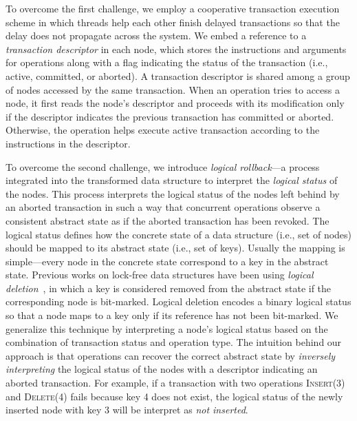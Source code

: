 \documentclass[]{sig-alternate-05-2015}
\begin{document}

To overcome the first challenge, we employ a cooperative transaction execution scheme in which threads help each other finish delayed transactions so that the delay does not propagate across the system.
We embed a reference to a \emph{transaction descriptor} in each node, which stores the instructions and arguments for operations along with a flag indicating the status of the transaction (i.e., active, committed, or aborted).
A transaction descriptor is shared among a group of nodes accessed by the same transaction. 
When an operation tries to access a node, it first reads the node's descriptor and proceeds with its modification only if the descriptor indicates the previous transaction has committed or aborted. 
Otherwise, the operation helps execute active transaction according to the instructions in the descriptor.

To overcome the second challenge, we introduce \emph{logical rollback}---a process integrated into the transformed data structure to interpret the \emph{logical status} of the nodes.
This process interprets the logical status of the nodes left behind by an aborted transaction in such a way that concurrent operations observe a consistent abstract state as if the aborted transaction has been revoked.
The logical status defines how the concrete state of a data structure (i.e., set of nodes) should be mapped to its abstract state (i.e., set of keys).
Usually the mapping is simple---every node in the concrete state correspond to a key in the abstract state.
Previous works on lock-free data structures have been using \emph{logical deletion}~\cite{harris2001pragmatic}, in which a key is considered removed from the abstract state if the corresponding node is bit-marked.
Logical deletion encodes a binary logical status so that a node maps to a key only if its reference has not been bit-marked.
We generalize this technique by interpreting a node's logical status based on the combination of transaction status and operation type.
The intuition behind our approach is that operations can recover the correct abstract state by \emph{inversely interpreting} the logical status of the nodes with a descriptor indicating an aborted transaction.
For example, if a transaction with two operations \textsc{Insert(3)} and \textsc{Delete(4)} fails because key 4 does not exist, the logical status of the newly inserted node with key 3 will be interpret as \emph{not inserted}.
\end{document}

